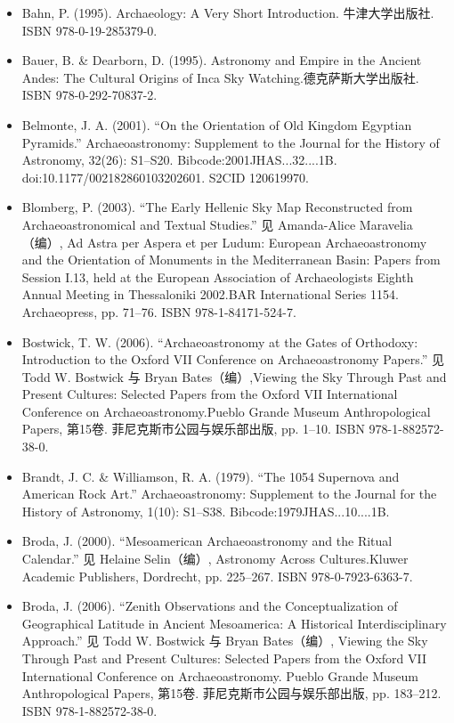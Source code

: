 \begin{itemize}
    \item Bahn, P. (1995). Archaeology: A Very Short Introduction. 牛津大学出版社. ISBN 978-0-19-285379-0.
    \item Bauer, B. \& Dearborn, D. (1995). Astronomy and Empire in the Ancient Andes: The Cultural Origins of Inca Sky Watching.德克萨斯大学出版社. ISBN 978-0-292-70837-2.
    \item Belmonte, J. A. (2001). “On the Orientation of Old Kingdom Egyptian Pyramids.” Archaeoastronomy: Supplement to the Journal for the History of Astronomy, 32(26): S1–S20. Bibcode:2001JHAS...32....1B. doi:10.1177/002182860103202601. S2CID 120619970.
    \item Blomberg, P. (2003). “The Early Hellenic Sky Map Reconstructed from Archaeoastronomical and Textual Studies.” 见 Amanda-Alice Maravelia（编）, Ad Astra per Aspera et per Ludum: European Archaeoastronomy and the Orientation of Monuments in the Mediterranean Basin: Papers from Session I.13, held at the European Association of Archaeologists Eighth Annual Meeting in Thessaloniki 2002.BAR International Series 1154. Archaeopress, pp. 71–76. ISBN 978-1-84171-524-7.
    \item Bostwick, T. W. (2006). “Archaeoastronomy at the Gates of Orthodoxy: Introduction to the Oxford VII Conference on Archaeoastronomy Papers.” 见 Todd W. Bostwick 与 Bryan Bates（编）,Viewing the Sky Through Past and Present Cultures: Selected Papers from the Oxford VII International Conference on Archaeoastronomy.Pueblo Grande Museum Anthropological Papers, 第15卷. 菲尼克斯市公园与娱乐部出版, pp. 1–10. ISBN 978-1-882572-38-0.
    \item Brandt, J. C. \& Williamson, R. A. (1979). “The 1054 Supernova and American Rock Art.” Archaeoastronomy: Supplement to the Journal for the History of Astronomy, 1(10): S1–S38. Bibcode:1979JHAS...10....1B.
    \item Broda, J. (2000). “Mesoamerican Archaeoastronomy and the Ritual Calendar.” 见 Helaine Selin（编）, Astronomy Across Cultures.Kluwer Academic Publishers, Dordrecht, pp. 225–267. ISBN 978-0-7923-6363-7.
    \item Broda, J. (2006). “Zenith Observations and the Conceptualization of Geographical Latitude in Ancient Mesoamerica: A Historical Interdisciplinary Approach.” 见 Todd W. Bostwick 与 Bryan Bates（编）, Viewing the Sky Through Past and Present Cultures: Selected Papers from the Oxford VII International Conference on Archaeoastronomy. Pueblo Grande Museum Anthropological Papers, 第15卷. 菲尼克斯市公园与娱乐部出版, pp. 183–212. ISBN 978-1-882572-38-0.

\end{itemize}
